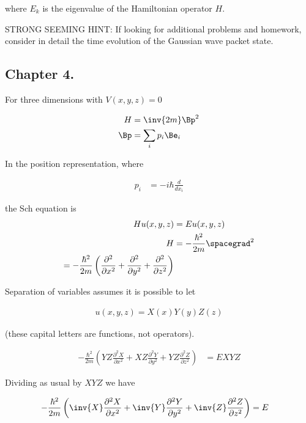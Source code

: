 where $E_k$ is the eigenvalue of the Hamiltonian operator $H$.

STRONG SEEMING HINT: If looking for additional problems and homework, consider in detail the time evolution of the Gaussian wave packet state.

\subsection{Chapter 4.}

For three dimensions with $V(x,y,z) = 0$

\begin{align*}
H &= \inv{2m} \Bp^2 \\
\Bp &= \sum_i p_i \Be_i \\
\end{align*}

In the position representation, where

\begin{align*}
p_i &= -i \hbar \frac{d}{dx_i}
\end{align*}

the Sch equation is
\begin{align*}
H u(x,y,z) &= E u(x,y,z) \\
H &= -\frac{\hbar^2}{2m} \spacegrad^2 \\
= -\frac{\hbar^2}{2m} \left(
\frac{\partial^2}{\partial {x}^2}
+\frac{\partial^2}{\partial {y}^2}
+\frac{\partial^2}{\partial {z}^2}
\right)
\end{align*}

Separation of variables assumes it is possible to let

\begin{align*}
u(x,y,z) = X(x) Y(y) Z(z)
\end{align*}

(these capital letters are functions, not operators).

\begin{align*}
-\frac{\hbar^2}{2m} \left(
YZ \frac{\partial^2 X}{\partial {x}^2}
+ XZ \frac{\partial^2 Y}{\partial {y}^2}
+ YZ \frac{\partial^2 Z}{\partial {z}^2}\right)
&= E X Y Z
\end{align*}

Dividing as usual by $XYZ$ we have

\begin{align*}
-\frac{\hbar^2}{2m} \left(
\inv{X} \frac{\partial^2 X}{\partial {x}^2}
+ \inv{Y} \frac{\partial^2 Y}{\partial {y}^2}
+ \inv{Z} \frac{\partial^2 Z}{\partial {z}^2} \right)
&= E
\end{align*}

